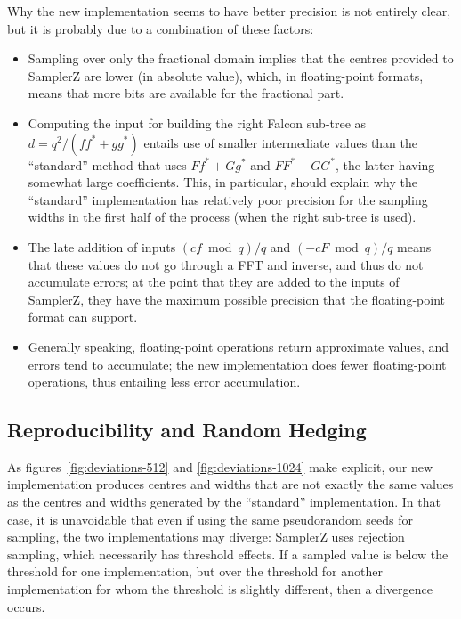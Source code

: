 \documentclass{llncs}
\newcommand{\adj}[1]{{#1}^*}
\begin{document}
Why the new implementation seems to have better precision is not
entirely clear, but it is probably due to a combination of these
factors:
\begin{itemize}

    \item Sampling over only the fractional domain implies that the
    centres provided to \textsf{SamplerZ} are lower (in absolute value),
    which, in floating-point formats, means that more bits are available
    for the fractional part.

    \item Computing the input for building the right Falcon sub-tree as
    $d = q^2/(f\adj{f} + g\adj{g})$ entails use of smaller intermediate
    values than the ``standard'' method that uses $F\adj{f} + G\adj{g}$
    and $F\adj{F} + G\adj{G}$, the latter having somewhat large
    coefficients. This, in particular, should explain why the
    ``standard'' implementation has relatively poor precision for the
    sampling widths in the first half of the process (when the right
    sub-tree is used).

    \item The late addition of inputs $(cf \bmod q)/q$ and $(-cF \bmod
    q)/q$ means that these values do not go through a FFT and inverse,
    and thus do not accumulate errors; at the point that they are added
    to the inputs of \textsf{SamplerZ}, they have the maximum possible
    precision that the floating-point format can support.

    \item Generally speaking, floating-point operations return
    approximate values, and errors tend to accumulate; the new
    implementation does fewer floating-point operations, thus
    entailing less error accumulation.

\end{itemize}

\subsection{Reproducibility and Random Hedging}\label{sec:hedging}

As figures~\ref{fig:deviations-512} and \ref{fig:deviations-1024} make
explicit, our new implementation produces centres and widths that are
not exactly the same values as the centres and widths generated by the
``standard'' implementation. In that case, it is unavoidable that even
if using the same pseudorandom seeds for sampling, the two
implementations may diverge: \textsf{SamplerZ} uses rejection sampling,
which necessarily has threshold effects. If a sampled value is below the
threshold for one implementation, but over the threshold for another
implementation for whom the threshold is slightly different, then a
divergence occurs.
\end{document}
